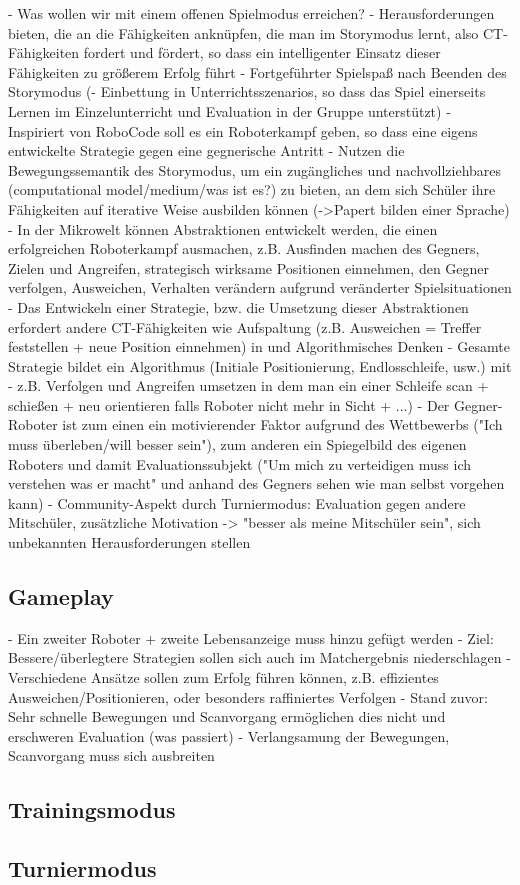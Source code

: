 - Was wollen wir mit einem offenen Spielmodus erreichen?
  - Herausforderungen bieten, die an die Fähigkeiten anknüpfen, die man im Storymodus lernt,
    also CT-Fähigkeiten fordert und fördert, so dass ein intelligenter Einsatz dieser Fähigkeiten zu größerem Erfolg führt
  - Fortgeführter Spielspaß nach Beenden des Storymodus
  (- Einbettung in Unterrichtsszenarios, so dass das Spiel einerseits Lernen im Einzelunterricht und Evaluation in der Gruppe unterstützt)
- Inspiriert von RoboCode soll es ein Roboterkampf geben, so dass eine eigens entwickelte Strategie gegen eine gegnerische Antritt
- Nutzen die Bewegungssemantik des Storymodus, um ein zugängliches und nachvollziehbares (computational model/medium/was ist es?) zu bieten, an dem sich Schüler ihre Fähigkeiten auf iterative Weise ausbilden können (->Papert bilden einer Sprache)
- In der Mikrowelt können Abstraktionen entwickelt werden, die einen erfolgreichen Roboterkampf ausmachen, z.B. Ausfinden machen des Gegners, Zielen und Angreifen, strategisch wirksame Positionen einnehmen, den Gegner verfolgen, Ausweichen, Verhalten verändern aufgrund veränderter Spielsituationen
- Das Entwickeln einer Strategie, bzw. die Umsetzung dieser Abstraktionen erfordert andere CT-Fähigkeiten wie Aufspaltung (z.B. Ausweichen = Treffer feststellen + neue Position einnehmen) in und Algorithmisches Denken
  - Gesamte Strategie bildet ein Algorithmus (Initiale Positionierung, Endlosschleife, usw.) mit 
  - z.B. Verfolgen und Angreifen umsetzen in dem man ein einer Schleife scan + schießen + neu orientieren falls Roboter nicht mehr in Sicht + ...)
- Der Gegner-Roboter ist zum einen ein motivierender Faktor aufgrund des Wettbewerbs ("Ich muss überleben/will besser sein"),
  zum anderen ein Spiegelbild des eigenen Roboters und damit Evaluationssubjekt ("Um mich zu verteidigen muss ich verstehen was er macht" und anhand des Gegners sehen wie man selbst vorgehen kann)
- Community-Aspekt durch Turniermodus: Evaluation gegen andere Mitschüler, zusätzliche Motivation -> "besser als meine Mitschüler sein", sich unbekannten Herausforderungen stellen

\subsection{Gameplay}

- Ein zweiter Roboter + zweite Lebensanzeige muss hinzu gefügt werden
- Ziel: Bessere/überlegtere Strategien sollen sich auch im Matchergebnis niederschlagen
- Verschiedene Ansätze sollen zum Erfolg führen können, z.B. effizientes Ausweichen/Positionieren, oder besonders raffiniertes Verfolgen
- Stand zuvor: Sehr schnelle Bewegungen und Scanvorgang ermöglichen dies nicht und erschweren Evaluation (was passiert)
- Verlangsamung der Bewegungen, Scanvorgang muss sich ausbreiten

\subsection{Trainingsmodus}


\subsection{Turniermodus}
